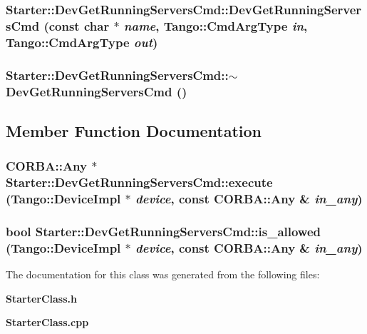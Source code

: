\subsubsection{\setlength{\rightskip}{0pt plus 5cm}Starter::Dev\-Get\-Running\-Servers\-Cmd::Dev\-Get\-Running\-Servers\-Cmd (const char $\ast$ {\em name}, Tango::Cmd\-Arg\-Type {\em in}, Tango::Cmd\-Arg\-Type {\em out})}\label{classStarter_1_1DevGetRunningServersCmd_a1}


\subsubsection{\setlength{\rightskip}{0pt plus 5cm}Starter::Dev\-Get\-Running\-Servers\-Cmd::$\sim$Dev\-Get\-Running\-Servers\-Cmd ()\hspace{0.3cm}{\tt  [inline]}}\label{classStarter_1_1DevGetRunningServersCmd_a2}




\subsection{Member Function Documentation}
\subsubsection{\setlength{\rightskip}{0pt plus 5cm}CORBA::Any $\ast$ Starter::Dev\-Get\-Running\-Servers\-Cmd::execute (Tango::Device\-Impl $\ast$ {\em device}, const CORBA::Any \& {\em in\_\-any})\hspace{0.3cm}{\tt  [virtual]}}\label{classStarter_1_1DevGetRunningServersCmd_a4}


\subsubsection{\setlength{\rightskip}{0pt plus 5cm}bool Starter::Dev\-Get\-Running\-Servers\-Cmd::is\_\-allowed (Tango::Device\-Impl $\ast$ {\em device}, const CORBA::Any \& {\em in\_\-any})\hspace{0.3cm}{\tt  [virtual]}}\label{classStarter_1_1DevGetRunningServersCmd_a3}




The documentation for this class was generated from the following files:\begin{CompactItemize}
\item 
{\bf Starter\-Class.h}\item 
{\bf Starter\-Class.cpp}\end{CompactItemize}
